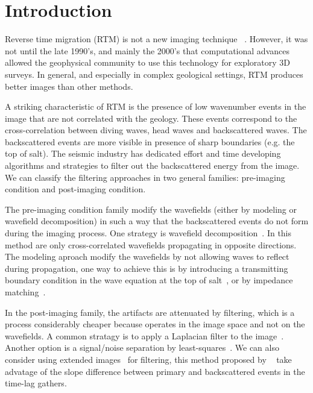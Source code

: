 \section{Introduction}

Reverse time migration (RTM) is not a new imaging technique ~\citep{baysal:1514, whitmore:382, GPR:GPR413}.
However, it was not until the late 1990’s, and mainly the 2000’s that computational
 advances allowed the geophysical community to use this technology for exploratory
3D surveys. In general, and especially in complex geological settings, RTM produces better 
images than other methods. 

A striking characteristic of RTM is the presence of low wavenumber events in the image that
 are not correlated with the geology. These events correspond to the cross-correlation between diving waves, head waves 
and backscattered waves. The backscattered events are more visible in
presence of sharp boundaries (e.g. the top of salt). The seismic industry has dedicated effort and time developing algorithms and strategies
to filter out the backscattered energy from the image. We can classify the filtering
 approaches in two general families: pre-imaging condition and post-imaging condition. 

The pre-imaging condition family modify the wavefields (either by modeling or wavefield decomposition)
 in such a way that the backscattered events do not form during the imaging process.
One strategy is wavefield decomposition~\citep[]{liu:S29,fei:3130}. In this method are only cross-correlated
 wavefields propagating in opposite directions. The modeling aproach modify the wavefields by not
allowing waves to reflect during propagation, one way to achieve this is by introducing a transmitting
boundary condition in the wave equation at the top of salt~\citep{fletcher:2049}, or by impedance matching~\citep{baysal:132}. 


In the post-imaging family, the artifacts are attenuated by filtering, which is a process
 considerably cheaper because operates in the image space and not on the wavefields. A common
stratagy is to apply a Laplacian filter to the image~\citep{youn:246}. Another option
is a signal/noise separation by least-squares~\citep{guitton:S19}. We can also consider using
extended images~\citep{rickett:883,sava:S209,GPR:GPR888} for filtering, this method proposed
by ~\cite{kaelin:3125} take advatage of the slope difference between primary and 
backscattered events in the time-lag gathers.

